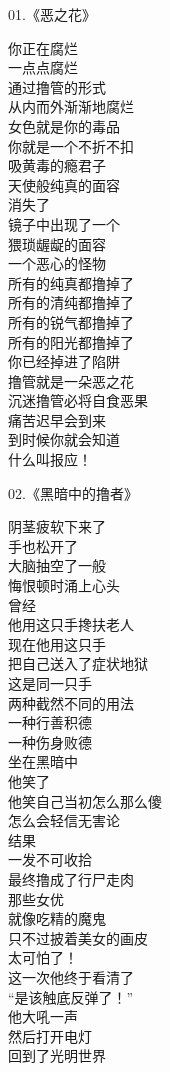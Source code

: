 \begin{multicols}{2}
    \begin{center}
        01.《恶之花》\it

        你正在腐烂 \\ 一点点腐烂 \\ 通过撸管的形式 \\ 从内而外渐渐地腐烂 \\ 女色就是你的毒品 \\ 你就是一个不折不扣 \\ 吸黄毒的瘾君子 \\ 天使般纯真的面容 \\ 消失了 \\ 镜子中出现了一个 \\ 猥琐龌龊的面容 \\ 一个恶心的怪物 \\ 所有的纯真都撸掉了 \\ 所有的清纯都撸掉了 \\ 所有的锐气都撸掉了 \\ 所有的阳光都撸掉了 \\ 你已经掉进了陷阱 \\ 撸管就是一朵恶之花 \\ 沉迷撸管必将自食恶果 \\ 痛苦迟早会到来 \\ 到时候你就会知道 \\ 什么叫报应！
    \end{center}

    \begin{center}
        02.《黑暗中的撸者》\it

        阴茎疲软下来了 \\ 手也松开了 \\ 大脑抽空了一般 \\ 悔恨顿时涌上心头 \\ 曾经 \\ 他用这只手搀扶老人 \\ 现在他用这只手 \\ 把自己送入了症状地狱 \\ 这是同一只手 \\ 两种截然不同的用法 \\ 一种行善积德 \\ 一种伤身败德 \\ 坐在黑暗中 \\ 他笑了 \\ 他笑自己当初怎么那么傻 \\ 怎么会轻信无害论 \\ 结果 \\ 一发不可收拾 \\ 最终撸成了行尸走肉 \\ 那些女优 \\ 就像吃精的魔鬼 \\ 只不过披着美女的画皮 \\ 太可怕了！ \\ 这一次他终于看清了 \\ “是该触底反弹了！” \\ 他大吼一声 \\ 然后打开电灯 \\ 回到了光明世界
    \end{center}


\end{multicols}
